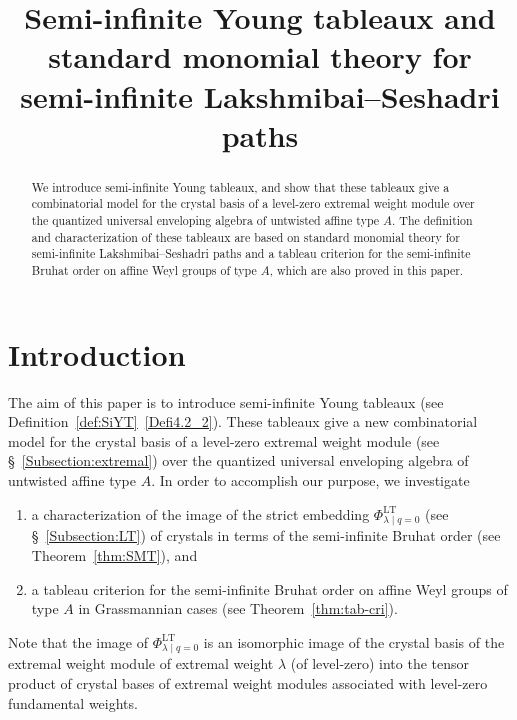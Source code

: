 \documentclass[10pt]{amsart}
\author{\firstname{Motohiro} \lastname{Ishii}}
\title
[Semi-infinite Young tableaux]
{Semi-infinite Young tableaux and standard monomial theory for semi-infinite Lakshmibai--Seshadri paths}
\theoremstyle{definition}\newtheorem{defi}[theo]{Definition}
\theoremstyle{remark}\newtheorem{rema}[theo]{Remark}
\DeclareMathOperator{\LT}{LT}
\begin{document}
\begin{abstract}
We introduce semi-infinite Young tableaux, 
and show that these tableaux give a 
combinatorial model for the crystal basis 
of a level-zero extremal weight module 
over the quantized universal enveloping algebra of untwisted affine type $A$. 
The definition and characterization of these tableaux are based on 
standard monomial theory for semi-infinite Lakshmibai--Seshadri paths 
and a tableau criterion for the semi-infinite Bruhat order 
on affine Weyl groups of type $A$, 
which are also proved in this paper. 
\end{abstract}


\maketitle
\section{Introduction}

The aim of this paper is to introduce semi-infinite Young tableaux
(see Definition~\ref{def:SiYT}~\ref{Defi4.2_2}). 
These tableaux give a new combinatorial model for 
the crystal basis of a level-zero extremal weight module 
(see \S~\ref{Subsection:extremal})
over the quantized universal enveloping algebra of untwisted affine type $A$. 
In order to accomplish our purpose, we investigate 
\begin{enumerate}[label=(\roman*)]
\item
a characterization of 
the image of the strict embedding 
$\Phi_{\lambda \mid q=0}^{\LT }$ (see \S~\ref{Subsection:LT})
of crystals in terms of the semi-infinite Bruhat order 
(see Theorem~\ref{thm:SMT}), and 
\item
a tableau criterion for the semi-infinite Bruhat order on 
affine Weyl groups of type $A$ in Grassmannian cases (see Theorem~\ref{thm:tab-cri}).
\end{enumerate}
Note that the image of 
$\Phi_{\lambda \mid q=0}^{\LT }$
is an isomorphic image of the crystal basis of 
the extremal weight module of extremal weight $\lambda$ (of level-zero) 
into the tensor product of crystal bases of extremal weight modules 
associated with level-zero fundamental weights. 
\end{document}
